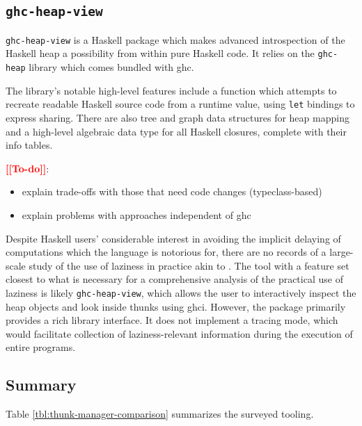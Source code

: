 \documentclass[thesis=B,english]{FITthesis}[2019/12/23]
\newcommand{\todo}[1]{\textcolor{red}{\textbf{[[#1]]}}}
\newcommand{\hackage}[1]{\texttt{#1}}
\newcommand{\hsCode}[1]{\texttt{#1}}
\begin{document}
\subsection*{\hackage{ghc-heap-view}} \label{sec:ghc-heap-view}
\hackage{ghc-heap-view} is a Haskell package which makes advanced introspection
of the Haskell heap a possibility from within pure Haskell code. It relies on
the \hackage{ghc-heap} library which comes bundled with \acrshort{ghc}.

The library's notable high-level features include a function which attempts to
recreate readable Haskell source code from a runtime value, using \hsCode{let}
bindings to express sharing. There are also tree and graph data structures for
heap mapping and a high-level algebraic data type for all Haskell closures,
complete with their info tables.

\todo{To-do}:
\begin{itemize}
	\item explain trade-offs with those that need code changes (typeclass-based)
	\item explain problems with approaches independent of \acrshort{ghc}
\end{itemize}

Despite Haskell users' considerable interest in avoiding the implicit delaying
of computations which the language is notorious for, there are no records of a
large-scale study of the use of laziness in practice akin to
\cite{emp-study-laziness-r}. The tool with a feature set closest to what is
necessary for a comprehensive analysis of the practical use of laziness is
likely \hackage{ghc-heap-view}, which allows the user to interactively inspect
the heap objects and look inside thunks using \acrshort{ghci}. However, the
package primarily provides a rich library interface. It does not implement a
tracing mode, which would facilitate collection of laziness-relevant
information during the execution of entire programs.

\subsection{Summary} \label{sec:summary}
Table \ref{tbl:thunk-manager-comparison} summarizes the surveyed tooling.
\end{document}

